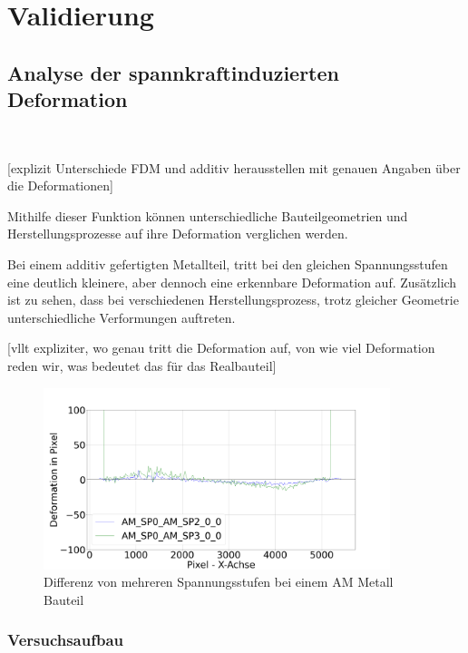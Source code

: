 
\chapter{Validierung}

\section{Analyse der spannkraftinduzierten Deformation}\

[explizit Unterschiede FDM und additiv herausstellen mit genauen Angaben über die Deformationen]

Mithilfe dieser Funktion können unterschiedliche Bauteilgeometrien und 
Herstellungsprozesse auf ihre Deformation verglichen werden.

Bei einem additiv gefertigten Metallteil, tritt bei den gleichen Spannungsstufen
eine deutlich kleinere, aber dennoch eine erkennbare Deformation auf.
Zusätzlich ist zu sehen, dass bei verschiedenen Herstellungsprozess, trotz
gleicher Geometrie unterschiedliche Verformungen auftreten.

[vllt expliziter, wo genau tritt die Deformation auf, 
von wie viel Deformation reden wir, was bedeutet das für das Realbauteil]

\begin{figure}[H]
    \centering
    \includegraphics[width=0.9\textwidth]{images/AM_sp0_sp2_defo_plot.png}
    \caption{Differenz von mehreren Spannungsstufen bei einem AM Metall Bauteil}
    \label{fig:deformation_data_am}
\end{figure}

\subsection{Versuchsaufbau}

